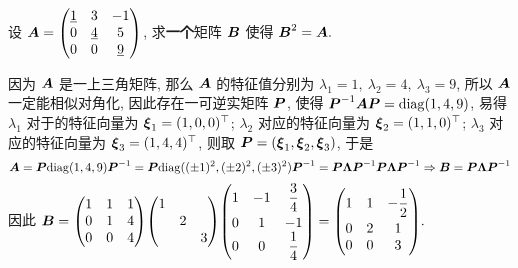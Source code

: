\begin{example}
    设 $\vb*{A}=\mqty(\underline{1}&3&-1\\0&\underline{4}&5\\0&0&\underline{9})$, 求\textbf{一个}矩阵 $\vb*{B}$ 使得 $\vb*{B}^2=\vb*{A}.$
\end{example}
\begin{solution}
    因为 $\vb*{A}$ 是一上三角矩阵, 那么 $\vb*{A}$ 的特征值分别为 $\lambda_1=1,~\lambda_2=4,~\lambda_3=9$, 所以 $\vb*{A}$ 一定能相似对角化, 
    因此存在一可逆实矩阵 $\vb*{P}$, 使得 $\vb*{P}^{-1}\vb*{AP}=\mathrm{diag}(1,4,9)$, 易得 $\lambda_1$ 对于的特征向量为 $\vb*{\xi}_1=(1,0,0)^\top$; $\lambda_2$ 对应的特征向量为 $\vb*{\xi}_2=(1,1,0)^\top$;
    $\lambda_3$ 对应的特征向量为 $\vb*{\xi}_3=(1,4,4)^\top$, 则取 $\vb*{P}=(\vb*{\xi}_1,\vb*{\xi}_2,\vb*{\xi}_3)$, 于是 
    $$\vb*{A}=\vb*{P}\mathrm{diag}(1,4,9)\vb*{P}^{-1}=\vb*{P}\mathrm{diag}((\pm1)^2,(\pm2)^2,(\pm3)^2)\vb*{P}^{-1}=\vb*{P\Lambda P}^{-1}\vb*{P\Lambda P}^{-1}\Rightarrow \vb*{B}=\vb*{P\Lambda P}^{-1}$$
    因此 $\vb*{B}=\mqty(1&1&1\\0&1&4\\0&0&4)\mqty(\dmat{1,2,3})\mqty(1&-1&\dfrac{3}{4}\\[6pt]0&1&-1\\0&0&\dfrac{1}{4})=\mqty(1&1&-\dfrac{1}{2}\\[6pt]0&2&1\\0&0&3).$
\end{solution}
